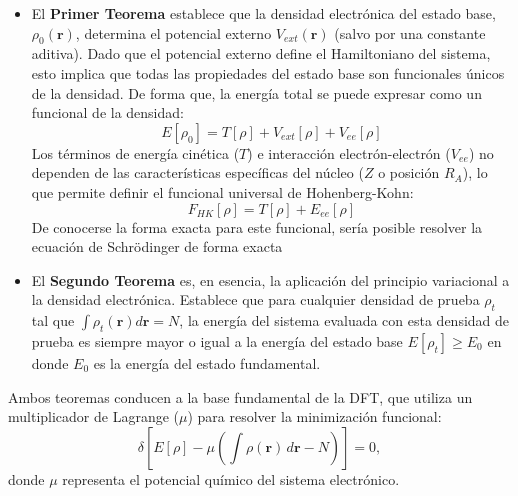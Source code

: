 \begin{itemize}
    \item El \textbf{Primer Teorema} establece que la densidad electrónica del estado base, $\rho_0(\mathbf{r})$, determina el potencial externo $V_{ext}(\mathbf{r})$ (salvo por una constante aditiva). Dado que el potencial externo define el Hamiltoniano del sistema, esto implica que todas las propiedades del estado base son funcionales únicos de la densidad. De forma que, la energía total se puede expresar como un funcional de la densidad:
            \begin{equation}
                E[\rho_0] = T[\rho] + V_{ext}[\rho] + V_{ee}[\rho]
                \label{eq:energy_functional}
            \end{equation}
    Los términos de energía cinética ($T$) e interacción electrón-electrón ($V_{ee}$) no dependen de las características específicas del núcleo ($Z$ o posición $R_A$), lo que permite definir el funcional universal de Hohenberg-Kohn:
            \begin{equation}
                F_{HK}[\rho] = T[\rho] + E_{ee}[\rho]
                \label{eq:universal_functional}
            \end{equation}
    De conocerse la forma exacta para este funcional, sería posible resolver la ecuación de Schrödinger de forma exacta
    \item El \textbf{Segundo Teorema} es, en esencia, la aplicación del principio variacional a la densidad electrónica. Establece que para cualquier densidad de prueba $\rho_t$ tal que $\int \rho_t(\mathbf{r}) d\mathbf{r} = N$, la energía del sistema evaluada con esta densidad de prueba es siempre mayor o igual a la energía del estado base $E[\rho_t] \geq E_0$ en donde $E_0$ es la energía del estado fundamental.

\end{itemize}

Ambos teoremas conducen a la base fundamental de la DFT, que utiliza un multiplicador de Lagrange ($\mu$) para resolver la minimización funcional:
\begin{equation}
    \delta \left[ E[\rho] - \mu \left( \int \rho(\mathbf{r}) \, d\mathbf{r} - N \right) \right] = 0,
    \label{eq:variational_principle_dft}
\end{equation}
donde $\mu$ representa el potencial químico del sistema electrónico.

